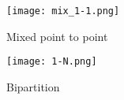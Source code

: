 \begin{figure}[!h]
  \begin{minipage}[b]{0.5\textwidth}
    \centering
    \texttt{[image: mix\_1-1.png]}
    \caption{Mixed point to point}\label{figtop:mix_1-1}
  \end{minipage}
  \hfill
  \begin{minipage}[b]{0.5\textwidth}
  \centering
    \texttt{[image: 1-N.png]}
    \caption{Bipartition}\label{figtop:1-n}
  \end{minipage}
\end{figure}





